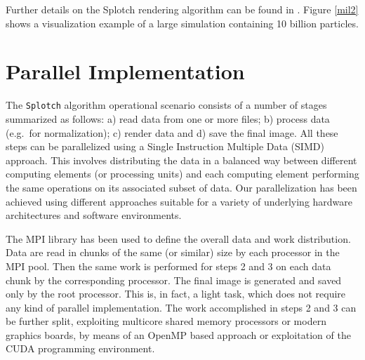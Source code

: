 \documentclass[1p,times]{elsarticle}
\begin{document}
%

Further details on the Splotch rendering algorithm can be found in \citep{2008NJPh...10l5006D}. 
Figure \ref{mil2} shows a visualization example of a large simulation
containing 10 billion particles.

\section{Parallel Implementation}
\label{parallel}

The {\tt Splotch} algorithm operational scenario consists of a number of 
stages summarized as follows: a) read data from one or more files; b) process data (e.g.\ for normalization); c) render data and d) save the final image. All these steps can be parallelized using a
Single Instruction Multiple Data (SIMD) approach. This involves distributing the data 
in a balanced way between different computing elements (or processing units) and each computing element performing the same operations on its associated subset of data. Our parallelization has been achieved using different approaches suitable for a variety of underlying hardware architectures and software environments.

The MPI library \cite{mpi} has been used to define the overall data and work 
distribution. Data are read in chunks of the same (or similar) size by each processor
in the MPI pool. Then the same work is performed for steps 2 and 3 on each data chunk by the
corresponding processor. The final image is generated and saved only by the root processor. This is, in fact, a light task, which does not require any kind of parallel implementation.
The work accomplished in steps 2 and 3 can be further split, exploiting 
multicore shared memory processors or modern graphics boards, by means of
an OpenMP \cite{openmp} based approach or exploitation of the CUDA \cite{cuda} programming 
environment. 
\end{document}
